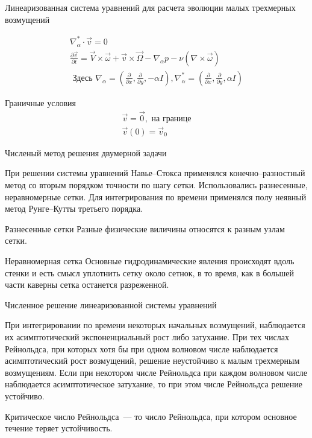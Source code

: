 \documentclass{beamer}
\begin{document}
\begin{frame}{Линеаризованная система уравнений для расчета эволюции малых трехмерных возмущений}
	\begin{block}{}
		\begin{gather*} 
 		 	\nabla_\alpha^* \cdot \vec v = 0 \\
   			\frac{\partial \vec v}{\partial t} = \vec V \times \vec \omega + \vec v \times \vec \Omega - 
			\nabla_\alpha p - \nu ( \nabla \times \vec \omega ) \\
			\text{	Здесь }   \nabla_\alpha = (\frac{\partial}{\partial x},\frac{\partial}{\partial y},-\alpha I), 
  \nabla_\alpha^* = (\frac{\partial}{\partial x},\frac{\partial}{\partial y},\alpha I) 
		\end{gather*}
	\end{block}

	\begin{block}{Граничные условия}
		\begin{gather*}
	  		\vec v = \vec 0, \text{ на границе} \\
  			\vec v (0) = \vec v _0 
		\end{gather*}
	\end{block}
\end{frame}

\begin{frame}{Численый метод решения двумерной задачи}
	\begin{block}{}
		При решении системы уравнений Навье--Стокса применялся конечно--разностный метод со вторым порядком точности по шагу сетки. 
		Использовались  разнесенные, неравномерные сетки. Для интегрирования по времени применялся полу неявный метод Рунге--Кутты 
		третьего порядка.  
	\end{block}
	\begin{block}{Разнесенные сетки}
		Разные физические виличины относятся к разным узлам сетки. 
	\end{block}

	\begin{block}{Неравномерная сетка}
		Основные гидродинамические явления происходят вдоль стенки и есть смысл уплотнить сетку около сетнок, в то время, как в большей части каверны сетка останется разреженной.
	\end{block}
\end{frame}

\begin{frame}{Численное решение линеаризованной системы уравнений}
	\begin{block}	{}
		При интегрировании по времени некоторых начальных возмущений, наблюдается их асимптотический экспоненциальный рост либо затухание.
		При тех числах Рейнольдса, при которых хотя бы при одном волновом числе наблюдается асимптотический рост возмущений, 
		решение неустойчиво к малым трехмерным возмущениям. Если при некотором числе Рейнольдса при каждом волновом числе наблюдается 
		асимптотическое затухание, то при этом числе Рейнольдса решение устойчиво. 

		Критическое число Рейнольдса~--- то число Рейнольдса, при котором основное течение теряет устойчивость.
	\end{block}
\end{frame}
\end{document}
